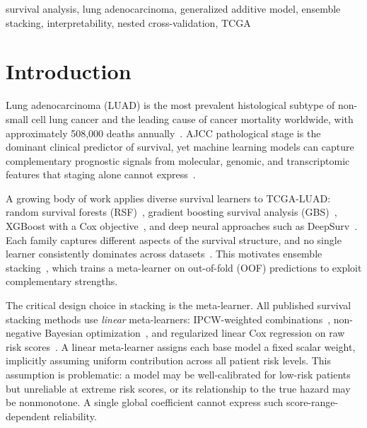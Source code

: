 \documentclass[conference]{IEEEtran}
\begin{document}
\begin{IEEEkeywords}
survival analysis, lung adenocarcinoma, generalized additive model,
ensemble stacking, interpretability, nested cross-validation, TCGA
\end{IEEEkeywords}

\section{Introduction}

Lung adenocarcinoma (LUAD) is the most prevalent histological subtype of
non-small cell lung cancer and the leading cause of cancer mortality
worldwide, with approximately 508,000 deaths annually~\cite{sung2021global}.
AJCC pathological stage is the dominant clinical predictor of survival,
yet machine learning models can capture complementary prognostic signals
from molecular, genomic, and transcriptomic features that staging
alone cannot express~\cite{cancer2014comprehensive}.

A growing body of work applies diverse survival learners to TCGA-LUAD:
random survival forests (RSF)~\cite{ishwaran2008random}, gradient boosting
survival analysis (GBS)~\cite{hothorn2006survival}, XGBoost with a Cox
objective~\cite{chen2016xgboost}, and deep neural approaches such as
DeepSurv~\cite{katzman2018deepsurv}.
Each family captures different aspects of the survival structure, and no
single learner consistently dominates across datasets~\cite{binder2009boosting}.
This motivates ensemble stacking~\cite{van2007super}, which trains a
meta-learner on out-of-fold (OOF) predictions to exploit complementary
strengths.

The critical design choice in stacking is the meta-learner.
All published survival stacking methods use \emph{linear} meta-learners:
IPCW-weighted combinations~\cite{lyu2026supersurv,golmakani2024joint},
non-negative Bayesian
optimization~\cite{zhao2024bayesian}, and regularized linear Cox regression
on raw risk scores~\cite{vock2016adapting}.
A linear meta-learner assigns each base model a fixed scalar weight,
implicitly assuming uniform contribution across all patient risk levels.
This assumption is problematic: a model may be well-calibrated for low-risk
patients but unreliable at extreme risk scores, or its relationship to
the true hazard may be nonmonotone.
A single global coefficient cannot express such score-range-dependent
reliability.
\end{document}
